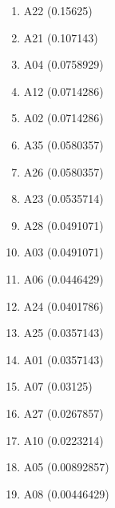 \begin{enumerate}
\item A22 (0.15625)
\item A21 (0.107143)
\item A04 (0.0758929)
\item A12 (0.0714286)
\item A02 (0.0714286)
\item A35 (0.0580357)
\item A26 (0.0580357)
\item A23 (0.0535714)
\item A28 (0.0491071)
\item A03 (0.0491071)
\item A06 (0.0446429)
\item A24 (0.0401786)
\item A25 (0.0357143)
\item A01 (0.0357143)
\item A07 (0.03125)
\item A27 (0.0267857)
\item A10 (0.0223214)
\item A05 (0.00892857)
\item A08 (0.00446429)
\end{enumerate}